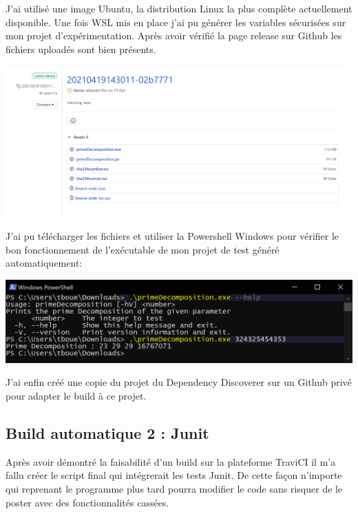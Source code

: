\documentclass[french,a4paper,12pt]{report}
\begin{document}
J’ai utilisé une image Ubuntu, la distribution Linux la plus complète actuellement disponible. Une fois WSL mis en place j’ai pu générer les variables sécurisées sur mon projet d'expérimentation. Après avoir vérifié la page release sur Github les fichiers uploadés sont bien présents.

\begin{center}
  \includegraphics[width=\textwidth]{ressources/images/github.png}
\end{center}

J'ai pu télécharger les fichiers et utiliser la Powershell Windows pour vérifier le bon fonctionnement de l’exécutable de mon projet de test généré automatiquement:

\begin{center}
  \includegraphics[width=\textwidth]{ressources/images/exePrime.png}
\end{center}

J'ai enfin créé une copie du projet du Dependency Discoverer sur un Github privé pour adapter le build à ce projet.

\subsection{Build automatique 2 : Junit}

Après avoir démontré la faisabilité d’un build sur la plateforme TraviCI il m’a fallu créer le script final qui intégrerait les tests Junit. De cette façon n’importe qui reprenant le programme plus tard pourra modifier le code sans risquer de le poster avec des fonctionnalités cassées.
\end{document}
